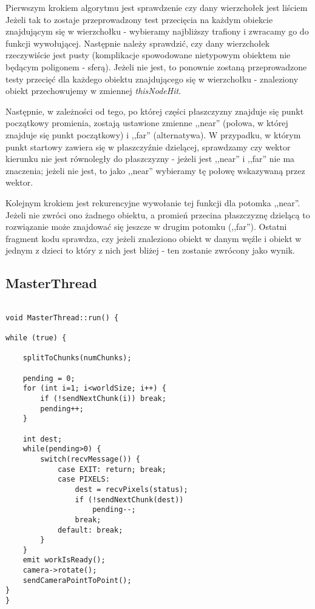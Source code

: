 Pierwszym krokiem algorytmu jest sprawdzenie czy dany wierzchołek jest liściem Jeżeli tak to zostaje przeprowadzony test przecięcia na każdym obiekcie znajdującym się w wierzchołku - wybieramy najbliższy trafiony i zwracamy go do funkcji wywołującej. Następnie należy sprawdzić, czy dany wierzchołek rzeczywiście jest pusty (komplikacje spowodowane nietypowym obiektem nie będącym poligonem - sferą). Jeżeli nie jest, to ponownie zostaną przeprowadzone testy przecięć dla każdego obiektu znajdującego się w wierzchołku - znaleziony obiekt przechowujemy w zmiennej \emph{thisNodeHit}.

Następnie, w zależności od tego, po której części płaszczyzny znajduje się punkt początkowy promienia, zostają ustawione zmienne ,,near'' (połowa, w której znajduje się punkt początkowy) i ,,far'' (alternatywa). W przypadku, w którym punkt startowy zawiera się w płaszczyźnie dzielącej, sprawdzamy czy wektor kierunku nie jest równoległy do płaszczyzny - jeżeli jest ,,near'' i ,,far'' nie ma znaczenia; jeżeli nie jest, to jako ,,near'' wybieramy tę połowę wskazywaną przez wektor.

Kolejnym krokiem jest rekurencyjne wywołanie tej funkcji dla potomka ,,near''. Jeżeli nie zwróci ono żadnego obiektu, a promień przecina płaszczyznę dzielącą to rozwiązanie może znajdować się jeszcze w drugim potomku (,,far''). Ostatni fragment kodu sprawdza, czy jeżeli znaleziono obiekt w danym węźle i obiekt w jednym z dzieci to który z nich jest bliżej - ten zostanie zwrócony jako wynik.

\subsection{MasterThread}
	
	
\begin{lstlisting}

void MasterThread::run() {

while (true) {

    splitToChunks(numChunks);

    pending = 0;
    for (int i=1; i<worldSize; i++) {
        if (!sendNextChunk(i)) break;
        pending++;
    }

    int dest;
    while(pending>0) {
        switch(recvMessage()) {
            case EXIT: return; break;
            case PIXELS:
                dest = recvPixels(status);
                if (!sendNextChunk(dest))
                    pending--;
                break;
            default: break;
        }
    }
 	emit workIsReady();
    camera->rotate();
    sendCameraPointToPoint();
}
}

\end{lstlisting}


